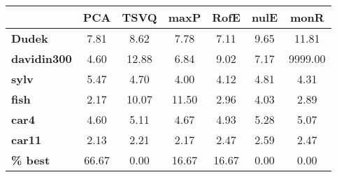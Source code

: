 \begin{tabular}{|l|c|c|c|c|c|c|}
\hline
&\textbf{PCA}&\textbf{TSVQ}&\textbf{maxP}&\textbf{RofE}&\textbf{nulE}&\textbf{monR}\\\hline
\textbf{Dudek}&7.81&8.62&7.78&7.11&9.65&11.81\\\hline
\textbf{davidin300}&4.60&12.88&6.84&9.02&7.17&9999.00\\\hline
\textbf{sylv}&5.47&4.70&4.00&4.12&4.81&4.31\\\hline
\textbf{fish}&2.17&10.07&11.50&2.96&4.03&2.89\\\hline
\textbf{car4}&4.60&5.11&4.67&4.93&5.28&5.07\\\hline
\textbf{car11}&2.13&2.21&2.17&2.47&2.59&2.47\\\hline
\textbf{ \% best}&66.67&0.00&16.67&16.67&0.00&0.00\\\hline
\end{tabular}
